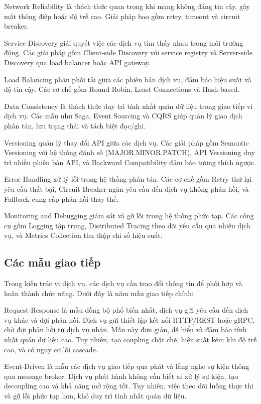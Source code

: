 Network Reliability là thách thức quan trọng khi mạng không đáng tin cậy, gây mất thông điệp hoặc độ trễ cao. Giải pháp bao gồm retry, timeout và circuit breaker.

Service Discovery giải quyết việc các dịch vụ tìm thấy nhau trong môi trường động. Các giải pháp gồm Client-side Discovery với service registry và Server-side Discovery qua load balancer hoặc API gateway.

Load Balancing phân phối tải giữa các phiên bản dịch vụ, đảm bảo hiệu suất và độ tin cậy. Các cơ chế gồm Round Robin, Least Connections và Hash-based.

Data Consistency là thách thức duy trì tính nhất quán dữ liệu trong giao tiếp vi dịch vụ. Các mẫu như Saga, Event Sourcing và CQRS \cite{richardson2019} giúp quản lý giao dịch phân tán, lưu trạng thái và tách biệt đọc/ghi.

Versioning quản lý thay đổi API giữa các dịch vụ. Các giải pháp gồm Semantic Versioning với hệ thống đánh số (MAJOR.MINOR.PATCH), API Versioning duy trì nhiều phiên bản API, và Backward Compatibility đảm bảo tương thích ngược.

Error Handling xử lý lỗi trong hệ thống phân tán. Các cơ chế gồm Retry thử lại yêu cầu thất bại, Circuit Breaker ngăn yêu cầu đến dịch vụ không phản hồi, và Fallback cung cấp phản hồi thay thế.

Monitoring and Debugging giám sát và gỡ lỗi trong hệ thống phức tạp. Các công cụ gồm Logging tập trung, Distributed Tracing theo dõi yêu cầu qua nhiều dịch vụ, và Metrics Collection thu thập chỉ số hiệu suất.

\subsection{Các mẫu giao tiếp}
Trong kiến trúc vi dịch vụ, các dịch vụ cần trao đổi thông tin để phối hợp và hoàn thành chức năng. Dưới đây là năm mẫu giao tiếp chính:

Request-Response là mẫu đồng bộ phổ biến nhất, dịch vụ gửi yêu cầu đến dịch vụ khác và đợi phản hồi. Dịch vụ gửi thiết lập kết nối HTTP/REST hoặc gRPC, chờ đợi phản hồi từ dịch vụ nhận. Mẫu này đơn giản, dễ hiểu và đảm bảo tính nhất quán dữ liệu cao. Tuy nhiên, tạo coupling chặt chẽ, hiệu suất kém khi độ trễ cao, và có nguy cơ lỗi cascade.

Event-Driven là mẫu các dịch vụ giao tiếp qua phát và lắng nghe sự kiện thông qua message broker. Dịch vụ phát hành không cần biết ai xử lý sự kiện, tạo decoupling cao và khả năng mở rộng tốt. Tuy nhiên, việc theo dõi luồng thực thi và gỡ lỗi phức tạp hơn, khó duy trì tính nhất quán dữ liệu.

